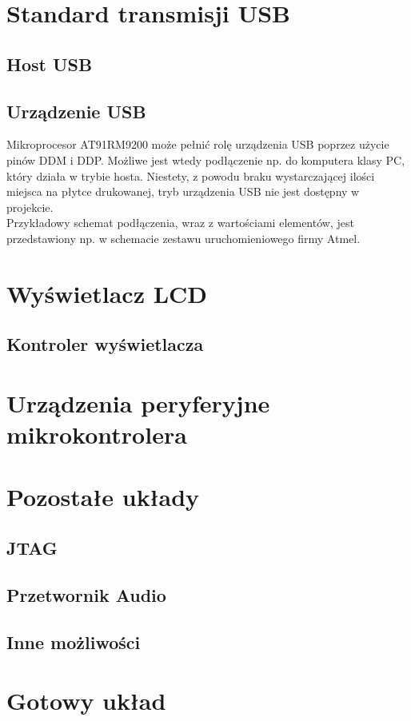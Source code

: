\documentclass[a4paper,12pt]{book}
\begin{document}
		\section{Standard transmisji USB}
			\subsection{Host USB}
			
			\subsection{Urządzenie USB}Mikroprocesor AT91RM9200 może pełnić rolę urządzenia USB poprzez użycie pinów DDM i DDP. Możliwe jest wtedy podłączenie np. do komputera klasy PC, który działa w trybie hosta. Niestety, z powodu braku wystarczającej ilości miejsca na płytce drukowanej, tryb urządzenia USB nie jest dostępny w projekcie.\\
			Przykładowy schemat podłączenia, wraz z wartościami elementów, jest przedstawiony np. w schemacie zestawu uruchomieniowego firmy Atmel\cite{at91rm9200_ek}.
			
		\section{Wyświetlacz LCD}
			\subsection{Kontroler wyświetlacza}
		\section{Urządzenia peryferyjne mikrokontrolera}
		\section{Pozostałe układy}
			\subsection{JTAG}
				\label{sec:jtag}
			\subsection{Przetwornik Audio}
			\subsection{Inne możliwości}
		\section{Gotowy układ}
			\label{sec:gotowy_uklad}
\end{document}
